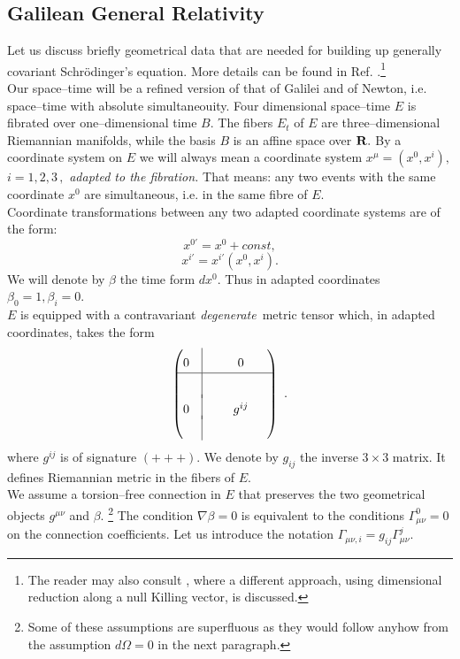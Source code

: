 \documentclass[12pt]{article}
\begin{document}
\subsection{Galilean General Relativity}
Let us discuss briefly geometrical data that are needed for building up
generally covariant Schr\"odinger's equation.  More details can be
found in Ref. \cite{jamo}.\footnote{The reader may also consult \cite{duv}, 
where a different approach,  using dimensional reduction along a
null Killing vector,  is discussed.  }\\
Our space--time will be a refined version of that of Galilei and
of Newton,  i.e.  space--time with absolute simultaneouity. 
Four dimensional space--time $E$ is fibrated over one--dimensional
time $B . $ The fibers $E_t$ of $E$ are three--dimensional
Riemannian manifolds,  while the basis $B$ is an affine space over
${\bf R} . $ By a coordinate system on $E$ we will always mean a
coordinate system $x^\mu= (x^0, x^i) , $ $i=1, 2, 3\,  , $ {\sl adapted
to the
fibration.}  That means: any two events with the same coordinate $x^0$ are
simultaneous,  i.e.  in the same fibre of $E . $\\
Coordinate transformations between any two adapted coordinate systems
are of the form: 
$$
x^{0'}=x^0+const , 
$$
$$
x^{i'}=x^{i'}\left (x^0, x^{i}\right) . 
$$
We will denote by $\beta$ the time form $dx^0 . $ Thus in adapted
coordinates $\beta_0=1, \beta_i=0$. \\
$E$ is equipped with a contravariant {\sl degenerate}\, metric tensor which,
in adapted coordinates, takes the form
\def\linie{\vrule height 15pt depth 5pt}
\def\back{\noalign{\vskip-3pt}}
$$\begin{pmatrix}0 &\linie & \phantom{0 }& 0 &\phantom{0}\cr
\noalign{\hrule}
&\linie && \cr\back
0 &\linie &  & g^{ij} & 
\cr\back
& \linie && 
\end{pmatrix} \ . $$
where $g^{ij}$ is of signature $ (+++) . $ We denote by $g_{ij}$ the
inverse $3\times 3$ matrix.  It defines Riemannian metric in the
fibers of $E . $\\
We assume a torsion--free connection in $E$ that preserves
the two geometrical objects $g^{\mu\nu}$ and $\beta$.%
\footnote{Some of these assumptions are superfluous
as they would
follow anyhow from the assumption $d\Omega=0$ in the next
paragraph. }
The condition $\nabla\beta =0$ is equivalent to the conditions 
$\Gamma^0_{\mu\nu}=0$ on the connection coefficients.  Let us
introduce the notation $\Gamma_{\mu\nu, i}=g_{ij}\Gamma^j_{\mu\nu}. $
\end{document}
